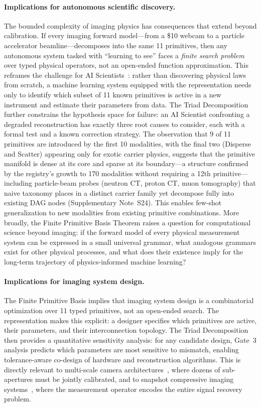 \paragraph{Implications for autonomous scientific discovery.}
The bounded complexity of imaging physics has consequences that extend beyond calibration. If every imaging forward model---from a \$10 webcam to a particle accelerator beamline---decomposes into the same 11 primitives, then any autonomous system tasked with ``learning to see'' faces a \emph{finite search problem} over typed physical operators, not an open-ended function approximation. This reframes the challenge for AI Scientists~\cite{wang2023scientific}: rather than discovering physical laws from scratch, a machine learning system equipped with the \opg{} representation needs only to identify which subset of 11 known primitives is active in a new instrument and estimate their parameters from data. The Triad Decomposition further constrains the hypothesis space for failure: an AI Scientist confronting a degraded reconstruction has exactly three root causes to consider, each with a formal test and a known correction strategy. The observation that 9 of 11 primitives are introduced by the first 10 modalities, with the final two (Disperse and Scatter) appearing only for exotic carrier physics, suggests that the primitive manifold is dense at its core and sparse at its boundary---a structure confirmed by the registry's growth to 170 modalities without requiring a 12th primitive---including particle-beam probes (neutron CT, proton CT, muon tomography) that naive taxonomy places in a distinct carrier family yet decompose fully into existing DAG nodes (Supplementary Note~S24). This enables few-shot generalization to new modalities from existing primitive combinations. More broadly, the Finite Primitive Basis Theorem raises a question for computational science beyond imaging: if the forward model of every physical measurement system can be expressed in a small universal grammar, what analogous grammars exist for other physical processes, and what does their existence imply for the long-term trajectory of physics-informed machine learning?

\paragraph{Implications for imaging system design.}
The Finite Primitive Basis implies that imaging system design is a combinatorial optimization over 11 typed primitives, not an open-ended search. The \opg{} representation makes this explicit: a designer specifies which primitives are active, their parameters, and their interconnection topology. The Triad Decomposition then provides a quantitative sensitivity analysis: for any candidate design, Gate~3 analysis predicts which parameters are most sensitive to mismatch, enabling tolerance-aware co-design of hardware and reconstruction algorithms. This is directly relevant to multi-scale camera architectures~\cite{brady2012multiscale}, where dozens of sub-apertures must be jointly calibrated, and to snapshot compressive imaging systems~\cite{yuan2021sci}, where the measurement operator encodes the entire signal recovery problem.

